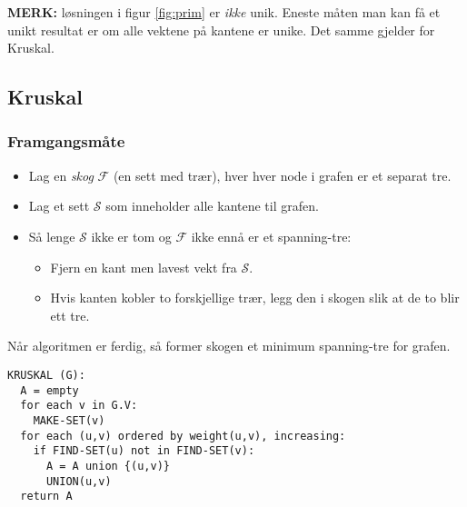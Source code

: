 \documentclass[11pt,a4paper]{article}
\theoremstyle{def}
\begin{document}
\textbf{MERK:} løsningen i figur \ref{fig:prim} er \textit{ikke} unik. Eneste måten man kan få et unikt resultat er om alle vektene på kantene er unike. Det samme gjelder for Kruskal.

\newpage

\subsection{Kruskal}
\subsubsection{Framgangsmåte}
\begin{itemize}
\item
Lag en \textit{skog} $\mathcal{F}$ (en sett med trær), hver hver node i grafen er et separat tre.
\item
Lag et sett $\mathcal{S}$ som inneholder alle kantene til grafen.
\item
Så lenge $\mathcal{S}$ ikke er tom og $\mathcal{F}$ ikke ennå er et spanning-tre:
\begin{itemize}
\item
Fjern en kant men lavest vekt fra $\mathcal{S}$.
\item
Hvis kanten kobler to forskjellige trær, legg den i skogen slik at de to blir ett tre.
\end{itemize}
\end{itemize}
Når algoritmen er ferdig, så former skogen et minimum spanning-tre for grafen. 

\begin{Verbatim}[frame=single]
KRUSKAL (G):
  A = empty
  for each v in G.V:
    MAKE-SET(v)
  for each (u,v) ordered by weight(u,v), increasing:
    if FIND-SET(u) not in FIND-SET(v):
      A = A union {(u,v)}
      UNION(u,v)
  return A
\end{Verbatim}
\end{document}
